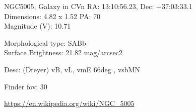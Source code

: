 \begin{block}{NGC5005, Galaxy in CVn}
    RA: 13:10:56.23, Dec: +37:03:33.1 \\ 
    Dimensions: 4.82 x 1.52 PA: 70 \\ 
    Magnitude (V): 10.71

    Morphological type: SABb \\ 
    Surface Brightness: 21.82 mag/arcsec2 

    Desc: (Dreyer) vB, vL, vmE 66deg , vsbMN 

    Finder fov: 30 

    \url{https://en.wikipedia.org/wiki/NGC_5005} 
\end{block}